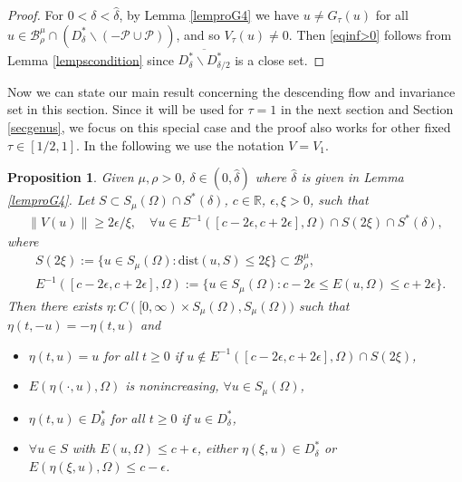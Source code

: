 \documentclass[10pt,a4paper]{article}
\newtheorem{proposition}[theorem]{Proposition}
\theoremstyle{definition} \theoremstyle{remark}
\numberwithin{equation}{section}
\newcommand{\R}{\mathbb{R}}
\newcommand{\B}{\mathcal{B}}
\newcommand{\p}{\mathcal{P}}
\begin{document}
\begin{proof}
	For $0 < \delta < \hat \delta$, by Lemma \ref{lemproG4} we have $u \neq G_\tau(u)$ for all $u \in \B_\rho^\mu \cap (D_\delta^*\backslash (-\p \cup \p))$, and so $V_\tau(u) \neq 0$. Then \eqref{eqinf>0} follows from Lemma \ref{lempscondition} since $\overline{D_\delta^*\backslash D_{\delta/2}^*}$ is a close set.
\end{proof}

Now we can state our main result concerning the descending flow and invariance set in this section. Since it will be used for $\tau = 1$ in the next section and Section \ref{secgenus}, we focus on this special case and the proof also works for other fixed $\tau \in [1/2,1]$. In the following we use the notation $V = V_1$.

\begin{proposition} \label{propdescendingflow}
	Given $\mu, \rho > 0$, $\delta \in (0,\hat\delta)$ where $\hat\delta$ is given in Lemma \ref{lemproG4}. Let $S \subset S_\mu(\Omega) \cap S^*(\delta)$, $c \in \R$, $\epsilon, \xi > 0$, such that
	\begin{align} \label{eqlowboundofV}
		\|V(u)\| \geq 2\epsilon /\xi, \quad \forall u \in E^{-1}([c-2\epsilon,c+2\epsilon],\Omega) \cap S(2\xi) \cap S^*(\delta),
	\end{align}
    where
    \begin{align}
    	& S(2\xi) := \bigl\{u \in S_\mu(\Omega): \text{dist}(u,S) \leq 2\xi \bigr\} \subset \B_\rho^\mu, \label{eqS2xi} \\
    	& E^{-1}([c-2\epsilon,c+2\epsilon],\Omega) := \bigl\{u \in S_\mu(\Omega): c-2\epsilon \leq E(u,\Omega) \leq c+2\epsilon \bigr\}.
    \end{align}
    Then there exists $\eta: C([0,\infty) \times S_\mu(\Omega), S_\mu(\Omega))$ such that $\eta(t,-u) = -\eta(t,u)$ and
	\begin{itemize}
		\item[(i)] $\eta(t,u) = u$ for all $t \geq 0$ if $u \notin E^{-1}([c-2\epsilon,c+2\epsilon],\Omega) \cap S(2\xi)$,
		\item[(ii)] $E(\eta(\cdot,u),\Omega)$ is nonincreasing, $\forall u \in S_\mu(\Omega)$,
		\item[(iii)] $\eta(t,u) \in D_\delta^*$ for all $t \geq 0$ if $u \in D_\delta^*$,
		\item[(iv)] $\forall u \in S$ with $E(u,\Omega) \leq c + \epsilon$, either $\eta(\xi,u) \in D_\delta^*$ or $E(\eta(\xi,u),\Omega) \leq c -\epsilon$.
	\end{itemize}
\end{proposition}
\end{document}
